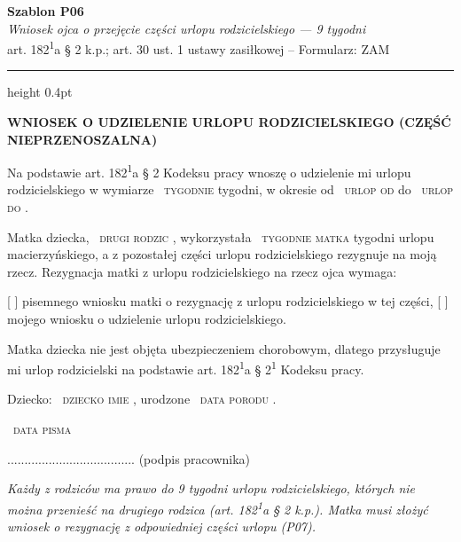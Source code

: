 \documentclass[11pt,a4paper]{article}
\newcommand{\Pole}[1]{%
  \textcolor{szary}{\dotfill}\,%
  {\scriptsize\textcolor{szary}{\textsc{#1}}}%
}
\newenvironment{warunek}[1]{%
  \par\smallskip\noindent\begin{minipage}{\linewidth}%
  \color{black}%
}{%
  \end{minipage}\par\smallskip%
}
\newcommand{\NaglowekPisma}[1]{%
  \par\vspace{0.8em}%
  \begin{center}%
    {\large\bfseries\MakeUppercase{#1}}%
  \end{center}%
  \vspace{0.4em}%
}
\begin{document}
\begin{flushright}
{\footnotesize\color{szary}
\textbf{Szablon P06}\\
{\itshape Wniosek ojca o przejęcie części urlopu rodzicielskiego --- 9 tygodni}\\
art. 182\textsuperscript{1}a \S{} 2 k.p.; art. 30 ust. 1 ustawy zasiłkowej -- Formularz: ZAM}\
\end{flushright}

\vspace{0.5em}
{\color{ramka}\hrule height 0.4pt}
\vspace{0.8em}

\NaglowekPisma{WNIOSEK O UDZIELENIE URLOPU RODZICIELSKIEGO (CZĘŚĆ NIEPRZENOSZALNA)}

Na podstawie art. 182\textsuperscript{1}a \S{} 2 Kodeksu pracy wnoszę o udzielenie mi urlopu
rodzicielskiego w wymiarze \Pole{tygodnie} tygodni, w okresie od \Pole{urlop od} do \Pole{urlop do}.

Matka dziecka, \Pole{drugi rodzic}, wykorzystała \Pole{tygodnie matka} tygodni urlopu
macierzyńskiego, a z pozostałej części urlopu rodzicielskiego rezygnuje na
moją rzecz. Rezygnacja matki z urlopu rodzicielskiego na rzecz ojca wymaga:

[ ] pisemnego wniosku matki o rezygnację z urlopu rodzicielskiego w tej części,
[ ] mojego wniosku o udzielenie urlopu rodzicielskiego.

\begin{warunek}{jesli_matka_nieubezpieczona}
Matka dziecka nie jest objęta ubezpieczeniem chorobowym, dlatego przysługuje\\[-2pt]
mi urlop rodzicielski na podstawie art. 182\textsuperscript{1}a \S{} 2\textsuperscript{1} Kodeksu pracy.
\end{warunek}

Dziecko: \Pole{dziecko imie}, urodzone \Pole{data porodu}.

\Pole{data pisma}
.....................................
(podpis pracownika)

\vfill
{\footnotesize\textcolor{szary}\itshape Każdy z rodziców ma prawo do 9 tygodni urlopu rodzicielskiego, których nie można przenieść na drugiego rodzica (art. 182\textsuperscript{1}a \S{} 2 k.p.). Matka musi złożyć wniosek o rezygnację z odpowiedniej części urlopu (P07). }
\end{document}
